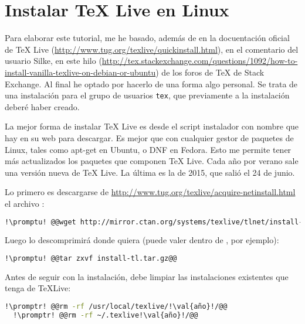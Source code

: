 \section{Instalar \TeX{} Live en Linux}\label{sec:inst-tex-l}
Para elaborar este tutorial, me he basado, además de en la docuentación oficial de \TeX{} Live
(\url{http://www.tug.org/texlive/quickinstall.html}), en el comentario del usuario Silke, en este hilo
(\url{http://tex.stackexchange.com/questions/1092/how-to-install-vanilla-texlive-on-debian-or-ubuntu}) de los
foros de \TeX{} de Stack Exchange. Al final he optado por hacerlo de una forma algo personal. Se trata de una
instalación para el grupo de usuarios \texttt{tex}, que previamente a la instalación deberé haber creado.

La mejor forma de instalar \TeX{} Live es desde el script instalador con nombre  que hay en su
web para descargar. Es mejor que con cualquier gestor de paquetes de Linux, tales como apt-get en Ubuntu, o DNF
en Fedora. Esto me permite tener más actualizados los paquetes que componen \TeX{} Live. Cada año por verano
sale una versión nueva de \TeX{} Live. La última es la de 2015, que salió el 24 de junio.

Lo primero es descargarse de \url{http://www.tug.org/texlive/acquire-netinstall.html} el archivo
:

\begin{lstlisting}[gobble=2,language=bash,style=bashinteract,escapechar=!]
  !\promptu! @@wget http://mirror.ctan.org/systems/texlive/tlnet/install-tl-unx.tar.gz@@
\end{lstlisting}

\noindent Luego lo descomprimirá donde quiera (puede valer dentro de , por ejemplo):

\begin{lstlisting}[gobble=2,language=bash,style=bashinteract,escapechar=!]
  !\promptu! @@tar zxvf install-tl.tar.gz@@
\end{lstlisting}

Antes de seguir con la instalación, debe limpiar las instalaciones existentes que tenga de \TeX Live:

\begin{lstlisting}[gobble=2,language=bash,style=bashinteract,escapechar=!]
  !\promptr! @@rm -rf /usr/local/texlive/!\val{año}!/@@
  !\promptr! @@rm -rf ~/.texlive!\val{año}!/@@
\end{lstlisting}

